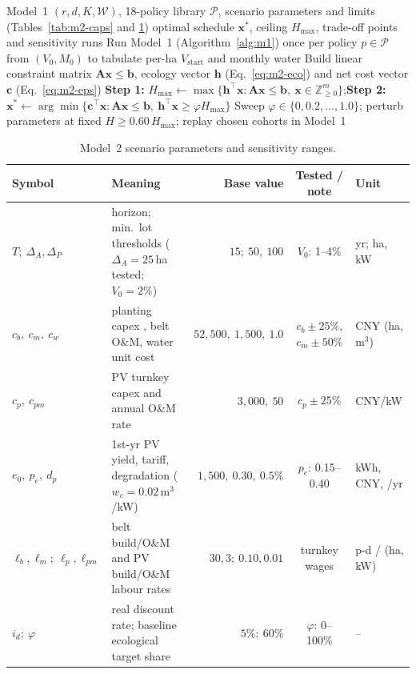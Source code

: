 \begin{algorithm}[!htb]
\caption{Cohort pre-simulation and two-step $\varepsilon$-constraint MILP}\label{alg:m2-milp}
\begin{algorithmic}[1]
\Require Model~1 $(r,d,K,\mathcal W)$, 18-policy library $\mathcal P$, scenario parameters and limits (Tables~\ref{tab:m2-caps} and \ref{tab:m2-par})
\Ensure optimal schedule $\bm x^*$, ceiling $H_{\max}$, trade-off points and sensitivity runs
\State Run Model~1 (Algorithm~\ref{alg:m1}) once per policy $p\in\mathcal P$ from $(V_0,M_0)$ to tabulate per-ha $V_{\mathrm{start}}$ and monthly water
\State Build linear constraint matrix $\bm A\bm x\le\bm b$, ecology vector $\bm h$ (Eq.~\eqref{eq:m2-eco}) and net cost vector $\bm c$ (Eq.~\eqref{eq:m2-eps})
\State \textbf{Step 1:} $H_{\max}\gets\max\{\bm h^\top\bm x:\bm A\bm x\le\bm b,\ \bm x\in\mathbb Z_{\ge0}^m\}$;\quad \textbf{Step 2:} $\bm x^*\gets\arg\min\{\bm c^\top\bm x:\bm A\bm x\le\bm b,\ \bm h^\top\bm x\ge\varphi H_{\max}\}$
\State Sweep $\varphi\in\{0,0.2,\dots,1.0\}$; perturb parameters at fixed $H\ge0.60\,H_{\max}$; replay chosen cohorts in Model~1
\end{algorithmic}
\end{algorithm}

\begin{table}[H]
\centering\small
\caption{Model~2 scenario parameters and sensitivity ranges.}
\label{tab:m2-par}
\renewcommand{\arraystretch}{1.06}
\begin{tabularx}{\linewidth}{@{}l X r c l@{}}
\toprule
Symbol & Meaning & Base value & Tested / note & Unit \\
\midrule
$T;\ \Delta_A,\Delta_P$ & horizon; min.\ lot thresholds ($\Delta_A=25$\,ha tested; $V_0=2\%$) & $15;\ 50,\ 100$ & $V_0$: 1--4\% & yr; ha, kW \\
$c_b,\ c_m,\ c_w$ & planting capex \cite{REF20}, belt O\&M, water unit cost & $52{,}500,\ 1{,}500,\ 1.0$ & $c_b\pm25\%$, $c_m\pm50\%$ & CNY (ha, m$^3$) \\
$c_p,\ c_{pm}$ & PV turnkey capex and annual O\&M rate & $3{,}000,\ 50$ & $c_p\pm25\%$ & CNY/kW \\
$e_0,\ p_e,\ d_p$ & 1st-yr PV yield, tariff, degradation \cite{EN06} ($w_c=0.02$\,m$^3$/kW) & $1{,}500,\ 0.30,\ 0.5\%$ & $p_e$: 0.15--0.40 & kWh, CNY, /yr \\
$\ell_b,\ell_m;\ \ell_p,\ell_{pm}$ & belt build/O\&M and PV build/O\&M labour rates & $30,3;\ 0.10,0.01$ & turnkey wages & p-d / (ha, kW) \\
$i_d;\ \varphi$ & real discount rate; baseline ecological target share & $5\%;\ 60\%$ & $\varphi$: 0--100\% & -- \\
\bottomrule
\end{tabularx}
\end{table}

